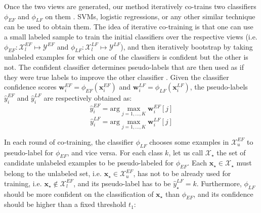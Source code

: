 \documentclass[journal,11pt]{IEEEtran}
\begin{document}
Once the two views are generated, our method iteratively co-trains two classifiers $\phi_{\scriptscriptstyle EF}$ and $\phi_{\scriptscriptstyle LF}$ on them \cite{blum1998combining}. SVMs, logistic regressions, or any other similar technique can be used to obtain them.
The idea of iterative co-training is that one can use a small labeled sample to train the initial classifiers over the respective views (i.e. $\phi_{\scriptscriptstyle EF}: \mathcal{X}_l^{\scriptscriptstyle EF} \mapsto {\mathcal{Y}}^{\scriptscriptstyle EF}$ and $\phi_{\scriptscriptstyle LF}: \mathcal{X}_l^{\scriptscriptstyle LF} \mapsto {\mathcal{Y}}^{\scriptscriptstyle LF}$), and then iteratively bootstrap by taking unlabeled examples for which one of the classifiers is confident but the
other is not. The confident classifier determines pseudo-labels \cite{lee2013pseudo} that are then used as if they were true labels to improve the other classifier \cite{balcan2004co}.
Given the classifier confidence scores $\mathbf{w}_i^{\scriptscriptstyle EF}=\phi_{\scriptscriptstyle EF}(\mathbf{x}_i^{\scriptscriptstyle EF})$ and $\mathbf{w}_i^{\scriptscriptstyle LF}=\phi_{\scriptscriptstyle LF}(\mathbf{x}_i^{\scriptscriptstyle LF})$, the pseudo-labels $\hat{y}_i^{\scriptscriptstyle EF}$ and $\hat{y}_i^{\scriptscriptstyle LF}$ are respectively obtained as:
\begin{equation}
\hat{y}_i^{\scriptscriptstyle EF}={\text{arg}} \!\!\! \max_{j=1,\ldots,K} \mathbf{w}_i^{\scriptscriptstyle EF}[j]
\label{eq:pseudo1}
\end{equation}
\begin{equation}
\hat{y}_i^{\scriptscriptstyle LF}={\text{arg}} \!\!\! \max_{j=1,\ldots,K} \mathbf{w}_i^{\scriptscriptstyle LF}[j]
\label{eq:pseudo2}
\end{equation}

In each round of co-training, the classifier $\phi_{\scriptscriptstyle LF}$ chooses some examples in $\mathcal{X}_u^{\scriptscriptstyle EF}$ to pseudo-label for $\phi_{\scriptscriptstyle EF}$, and vice versa.
For each class $k$, let us call $\mathcal{X}_\star$ the set of candidate unlabeled examples to be pseudo-labeled for $\phi_{\scriptscriptstyle EF}$. Each $\mathbf{x}_\star \in \mathcal{X}_\star$ must belong to the unlabeled set, i.e. $\mathbf{x}_\star \in \mathcal{X}_u^{\scriptscriptstyle EF}$, has not to be already used for training, i.e. $\mathbf{x}_\star \notin \mathcal{X}_l^{\scriptscriptstyle EF}$, and its pseudo-label has to be $\hat{y}_\star^{\scriptscriptstyle LF}=k$. Furthermore, $\phi_{\scriptscriptstyle LF}$ should be more confident on the classification of $\mathbf{x}_\star$ than $\phi_{\scriptscriptstyle EF}$, and its confidence should be higher than a fixed threshold $t_1$:
\end{document}
